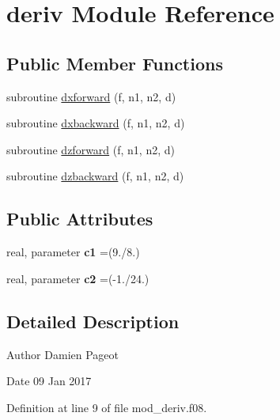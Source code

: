 \hypertarget{classderiv}{\section{deriv Module Reference}
\label{classderiv}
}
\subsection*{Public Member Functions}
\begin{DoxyCompactItemize}
\item 
subroutine \hyperlink{classderiv_ac21b6cd6df4475862b1aff089f1ae25f}{dxforward} (f, n1, n2, d)
\item 
subroutine \hyperlink{classderiv_a37b7e1130ab66fe4374bb59cbce5f25b}{dxbackward} (f, n1, n2, d)
\item 
subroutine \hyperlink{classderiv_a18a7090476375df6b783cf132c95176a}{dzforward} (f, n1, n2, d)
\item 
subroutine \hyperlink{classderiv_a5ec4f27003a2a501235ff4ecadc002b2}{dzbackward} (f, n1, n2, d)
\end{DoxyCompactItemize}
\subsection*{Public Attributes}
\begin{DoxyCompactItemize}
\item 
\hypertarget{classderiv_ad38c71b2f4408bf4a30862643887d9a5}{real, parameter {\bfseries c1} =(9./8.)}\label{classderiv_ad38c71b2f4408bf4a30862643887d9a5}

\item 
\hypertarget{classderiv_adf98c3293e2fe044ff33d9d4a746c38f}{real, parameter {\bfseries c2} =(-\/1./24.)}\label{classderiv_adf98c3293e2fe044ff33d9d4a746c38f}

\end{DoxyCompactItemize}


\subsection{Detailed Description}
\begin{DoxyAuthor}{Author}
Damien Pageot 
\end{DoxyAuthor}
\begin{DoxyDate}{Date}
09 Jan 2017 
\end{DoxyDate}


Definition at line 9 of file mod\-\_\-deriv.\-f08.



